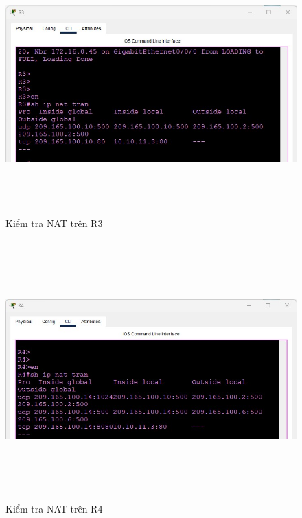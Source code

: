 \documentclass[a4paper, 12pt]{article}
\begin{document}
\begin{figure}[H]
    \centering
    \includegraphics[width=16cm, height=10cm]{img/nat3.jpg}
    \caption{Kiểm tra NAT trên R3}
    \label{nat3}
\end{figure}
\begin{figure}[H]
    \centering
    \includegraphics[width=16cm, height=10cm]{img/nat4.jpg}
    \caption{Kiểm tra NAT trên R4}
    \label{nat4}
\end{figure}
\end{document}
